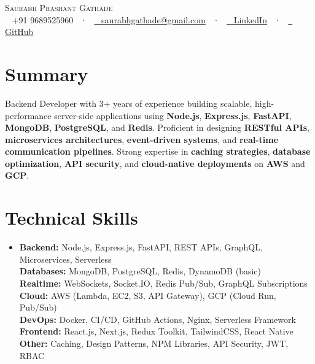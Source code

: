 \documentclass[letterpaper,11pt]{article}
\newcommand{\resumeSubHeadingListStart}{\begin{itemize}[leftmargin=0in,label={}]}
\newcommand{\resumeSubHeadingListEnd}{\end{itemize}}
\begin{document}
\begin{center}
{\Huge \scshape Saurabh Prashant Gathade} \\ \vspace{4pt}
\small
\faPhone~ +91 9689525960 ~·~
\href{mailto:saurabhgathade@gmail.com}{\faEnvelope~ saurabhgathade@gmail.com} ~·~
\href{https://www.linkedin.com/in/saurabhpgathade}{\faLinkedin~ LinkedIn} ~·~
\href{https://github.com/Saurabhgathade131}{\faGithub~ GitHub}
\end{center}

\section{Summary}
\small Backend Developer with 3+ years of experience building scalable, high-performance server-side applications using \textbf{Node.js}, \textbf{Express.js}, \textbf{FastAPI}, \textbf{MongoDB}, \textbf{PostgreSQL}, and \textbf{Redis}. Proficient in designing \textbf{RESTful APIs}, \textbf{microservices architectures}, \textbf{event-driven systems}, and \textbf{real-time communication pipelines}. Strong expertise in \textbf{caching strategies}, \textbf{database optimization}, \textbf{API security}, and \textbf{cloud-native deployments} on \textbf{AWS} and \textbf{GCP}.

\section{Technical Skills}
\resumeSubHeadingListStart
\item\small{
\textbf{Backend:} Node.js, Express.js, FastAPI, REST APIs, GraphQL, Microservices, Serverless \\
\textbf{Databases:} MongoDB, PostgreSQL, Redis, DynamoDB (basic) \\
\textbf{Realtime:} WebSockets, Socket.IO, Redis Pub/Sub, GraphQL Subscriptions \\
\textbf{Cloud:} AWS (Lambda, EC2, S3, API Gateway), GCP (Cloud Run, Pub/Sub) \\
\textbf{DevOps:} Docker, CI/CD, GitHub Actions, Nginx, Serverless Framework \\
\textbf{Frontend:} React.js, Next.js, Redux Toolkit, TailwindCSS, React Native \\
\textbf{Other:} Caching, Design Patterns, NPM Libraries, API Security, JWT, RBAC
}
\resumeSubHeadingListEnd
\vspace{-10pt}
\end{document}

